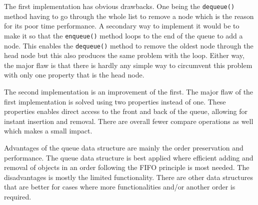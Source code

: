\documentclass[a4paper,11pt]{article}
\begin{document}
The first implementation has obvious drawbacks. One being the 
{\tt dequeue()} method having to go through the whole list to remove 
a node which is the reason for its poor time performance. A secondary
way to implement it would be to make it so that the {\tt enqueue()}
method loops to the end of the queue to add a node. This enables the
{\tt dequeue()} method to remove the oldest node through the head node
but this also produces the same problem with the loop. Either way, the
major flaw is that there is hardly any simple way to circumvent this
problem with only one property that is the head node. 

The second implementation is an improvement of the first. The major
flaw of the first implementation is solved using two properties 
instead of one. These properties enables direct access to the front
and back of the queue, allowing for instant insertion and removal. 
There are overall fewer compare operations as well which makes a
small impact.

Advantages of the queue data structure are mainly the order 
preservation and performance. The queue data structure is best
applied where efficient adding and removal of objects in an order
following the FIFO principle is most needed. The disadvantages is
mostly the limited functionality. There are other data structures
that are better for cases where more functionalities and/or another
order is required.
\end{document}
